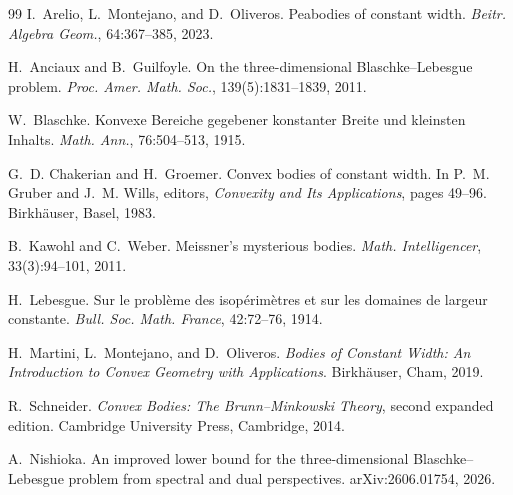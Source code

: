 \documentclass[11pt]{article}
\numberwithin{equation}{section}
\theoremstyle{remark}
\newtheorem{remark}[theorem]{Remark}
\begin{document}

\begin{thebibliography}{99}
I.~Arelio, L.~Montejano, and D.~Oliveros.
\newblock Peabodies of constant width.
\newblock \emph{Beitr. Algebra Geom.}, 64:367--385, 2023.

H.~Anciaux and B.~Guilfoyle.
\newblock On the three-dimensional Blaschke--Lebesgue problem.
\newblock \emph{Proc. Amer. Math. Soc.}, 139(5):1831--1839, 2011.

W.~Blaschke.
\newblock Konvexe Bereiche gegebener konstanter Breite und kleinsten Inhalts.
\newblock \emph{Math. Ann.}, 76:504--513, 1915.

G.~D. Chakerian and H.~Groemer.
\newblock Convex bodies of constant width.
\newblock In P.~M. Gruber and J.~M. Wills, editors, \emph{Convexity and Its Applications}, pages 49--96. Birkh\"auser, Basel, 1983.

B.~Kawohl and C.~Weber.
\newblock Meissner's mysterious bodies.
\newblock \emph{Math. Intelligencer}, 33(3):94--101, 2011.

H.~Lebesgue.
\newblock Sur le probl\`eme des isop\'erim\`etres et sur les domaines de largeur constante.
\newblock \emph{Bull. Soc. Math. France}, 42:72--76, 1914.

H.~Martini, L.~Montejano, and D.~Oliveros.
\newblock \emph{Bodies of Constant Width: An Introduction to Convex Geometry with Applications}.
\newblock Birkh\"auser, Cham, 2019.


R.~Schneider.
\newblock \emph{Convex Bodies: The Brunn--Minkowski Theory}, second expanded edition.
\newblock Cambridge University Press, Cambridge, 2014.

A.~Nishioka.
\newblock An improved lower bound for the three-dimensional Blaschke--Lebesgue problem from spectral and dual perspectives.
\newblock arXiv:2606.01754, 2026.
\end{thebibliography}
\end{document}
